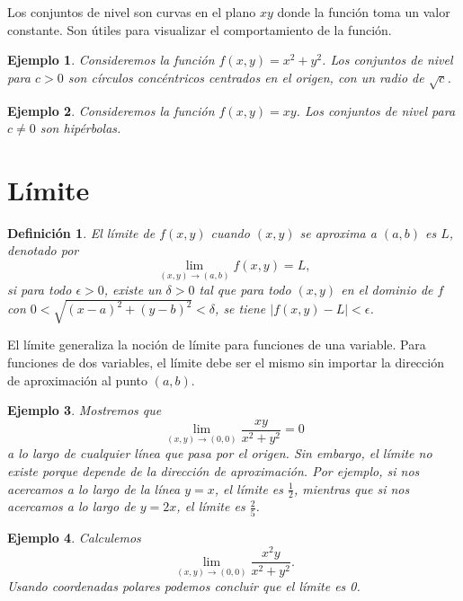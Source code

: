 \documentclass[11pt]{book}
\theoremstyle{definicion}
\theoremstyle{teorema}
\theoremstyle{ejemplo}
\newtheorem{definition}{Definición}
\newtheorem{example}{Ejemplo}
\begin{document}
Los conjuntos de nivel son curvas en el plano \(xy\) donde la función toma un valor constante. Son útiles para visualizar el comportamiento de la función.

\begin{example}
Consideremos la función \( f(x, y) = x^2 + y^2 \). Los conjuntos de nivel para \( c > 0 \) son círculos concéntricos centrados en el origen, con un radio de \(\sqrt{c}\).
\end{example}

\begin{example}
Consideremos la función \( f(x, y) = xy \). Los conjuntos de nivel para \( c \neq 0 \) son hipérbolas.
\end{example}

\section{Límite}
\begin{definition}
El límite de \( f(x, y) \) cuando \((x, y)\) se aproxima a \((a, b)\) es \( L \), denotado por
\[ \lim_{(x, y) \to (a, b)} f(x, y) = L, \]
si para todo \(\epsilon > 0\), existe un \(\delta > 0\) tal que para todo \((x, y)\) en el dominio de \(f\) con \(0 < \sqrt{(x - a)^2 + (y - b)^2} < \delta\), se tiene \(|f(x, y) - L| < \epsilon\).
\end{definition}

El límite generaliza la noción de límite para funciones de una variable. Para funciones de dos variables, el límite debe ser el mismo sin importar la dirección de aproximación al punto \((a, b)\).

\begin{example}
Mostremos que \[\lim_{(x, y) \to (0, 0)} \frac{xy}{x^2 + y^2} = 0\] a lo largo de cualquier línea que pasa por el origen. Sin embargo, el límite no existe porque depende de la dirección de aproximación. Por ejemplo, si nos acercamos a lo largo de la línea \(y = x\), el límite es \( \frac{1}{2} \), mientras que si nos acercamos a lo largo de \(y = 2x\), el límite es \( \frac{2}{5} \).
\end{example}

\begin{example}
Calculemos \[\lim_{(x, y) \to (0, 0)} \frac{x^2 y}{x^2 + y^2}.\] Usando coordenadas polares %
podemos concluir que el límite es 0.
\end{example}
\end{document}
